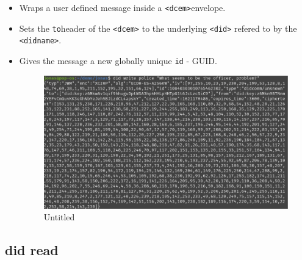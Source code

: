 \begin{itemize}
\item
  Wraps a user defined message inside a
  \lstinline!<dcem>!envelope.
\item
  Sets the \lstinline!to!header of the
  \lstinline!<dcem>! to the underlying
  \lstinline!<did>! refered to by the
  \lstinline!<didname>!.
\item
  Gives the message a new globally unique \lstinline!id! -
  GUID.

  \begin{figure}
  \centering
  \includegraphics{User Interface f8759a9462b24d5f95cf6123d68b89ea/Untitled 6.png}
  \caption{Untitled}
  \end{figure}
\end{itemize}

\hypertarget{did-read}{%
\subsection{\texorpdfstring{did read }{did read }}\label{did-read}}

